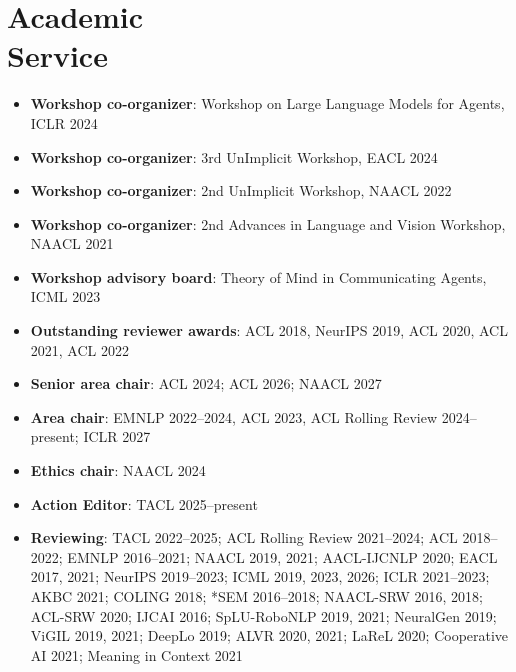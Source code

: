 \section{Academic \\ Service}
\begin{itemize}[leftmargin=-0.4mm,partopsep=0pt,label=]
  \item \textbf{Workshop co-organizer}: Workshop on Large Language Models for Agents, ICLR 2024

  \item \textbf{Workshop co-organizer}: 3rd UnImplicit Workshop, EACL 2024

  \item \textbf{Workshop co-organizer}: 2nd UnImplicit Workshop, NAACL 2022

  \item \textbf{Workshop co-organizer}: 2nd Advances in Language and Vision Workshop, NAACL 2021

  \item \textbf{Workshop advisory board}: Theory of Mind in Communicating Agents, ICML 2023

  \item \textbf{Outstanding reviewer awards}: ACL 2018, NeurIPS 2019, ACL 2020, ACL 2021, ACL 2022

  \item \textbf{Senior area chair}: ACL 2024; ACL 2026; NAACL 2027

  \item \textbf{Area chair}: EMNLP 2022--2024, ACL 2023, ACL Rolling Review 2024--present; ICLR 2027

  \item \textbf{Ethics chair}: NAACL 2024

  \item \textbf{Action Editor}: TACL 2025--present

  \item \textbf{Reviewing}: TACL 2022--2025; ACL Rolling Review 2021--2024; ACL 2018--2022; EMNLP 2016--2021; NAACL 2019, 2021; AACL-IJCNLP 2020; EACL 2017, 2021; NeurIPS 2019--2023; ICML 2019, 2023, 2026; ICLR 2021--2023; AKBC 2021; COLING 2018; *SEM 2016--2018; NAACL-SRW 2016, 2018; ACL-SRW 2020; IJCAI 2016; SpLU-RoboNLP 2019, 2021; NeuralGen 2019; ViGIL 2019, 2021; DeepLo 2019; ALVR 2020, 2021; LaReL 2020; Cooperative AI 2021; Meaning in Context 2021  \\



\end{itemize}
